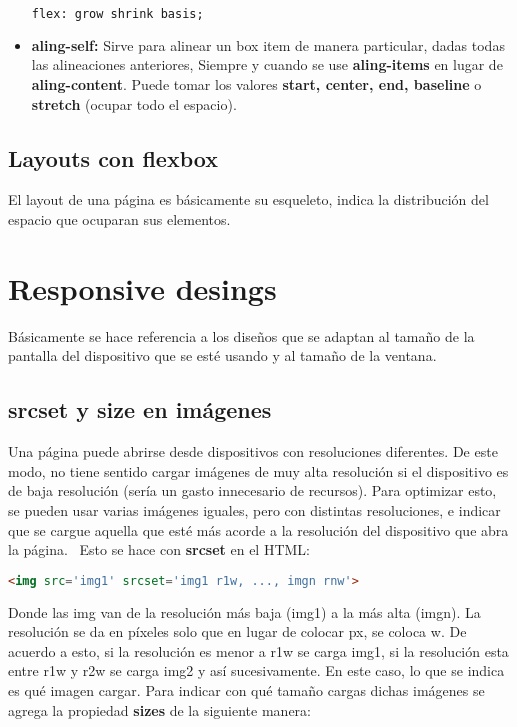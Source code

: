 \documentclass[10pt,oneside]{article}
\begin{document}
\begin{multicols}{2}
\begin{itemize}
    \begin{lstlisting}[language=HTML]
flex: grow shrink basis;
    \end{lstlisting}
    
        \item \textbf{aling-self:} Sirve para alinear un box item de manera particular, dadas todas las alineaciones anteriores, Siempre y cuando se use \textbf{aling-items} en lugar de \textbf{aling-content}. Puede tomar los valores \textbf{start, center, end, baseline} o \textbf{stretch} (ocupar todo el espacio).
    \end{itemize}

\subsection{Layouts con flexbox}

    El layout de una página es básicamente su esqueleto, indica la distribución del espacio que ocuparan sus elementos.

\section{Responsive desings}
    Básicamente se hace referencia a los diseños que se adaptan al tamaño de la pantalla del dispositivo que se esté usando y al tamaño de la ventana. 

\subsection{srcset y size en imágenes}

    Una página puede abrirse desde dispositivos con resoluciones diferentes. De este modo, no tiene sentido cargar imágenes de muy alta resolución si el dispositivo es de baja resolución (sería un gasto innecesario de recursos). Para optimizar esto,  se pueden usar varias imágenes iguales, pero con distintas resoluciones, e indicar que se cargue aquella que esté más acorde a la resolución del dispositivo que abra la página.  Esto se hace con \textbf{srcset} en el HTML:

    \begin{lstlisting}[language=HTML]
<img src='img1' srcset='img1 r1w, ..., imgn rnw'>
    \end{lstlisting}

    
    Donde las img van de la resolución más baja (img1) a la más alta (imgn). La resolución se da en píxeles solo que en lugar de colocar px, se coloca w. De acuerdo a esto, si la resolución es menor a r1w se carga img1, si la resolución esta entre r1w y r2w se carga img2 y así sucesivamente. En este caso, lo que se indica es qué imagen cargar. Para indicar con qué tamaño cargas dichas imágenes se agrega la propiedad \textbf{sizes} de la siguiente manera:


\end{multicols}
\end{document}
